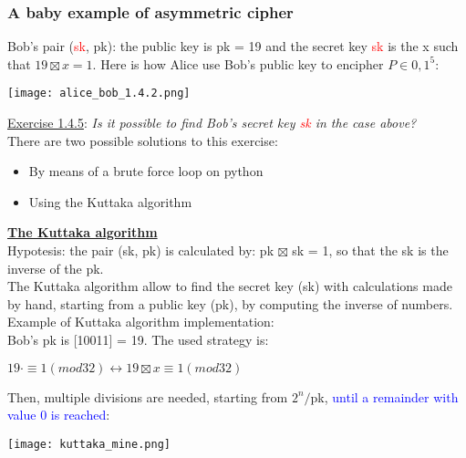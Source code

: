 \documentclass{article}
\begin{document}
\subsubsection{A baby example of asymmetric cipher}
Bob's pair (\textcolor{red}{sk}, pk): the public key is pk = 19 and the secret key \textcolor{red}{sk} is the x such that $19 \boxtimes x = 1$. Here is how Alice use Bob's public key to encipher $P \in {0,1}^5$:

\begin{center}
\texttt{[image: alice\_bob\_1.4.2.png]}
\end{center}

\underline{Exercise 1.4.5}: 
\textit{Is it possible to find Bob's secret key \textcolor{red}{sk} in the case above?}\\
There are two possible solutions to this exercise:
\begin{itemize}
    \item By means of a brute force loop on python
    \item Using the Kuttaka algorithm
\end{itemize}

\textbf{\underline{The Kuttaka algorithm}}\\
Hypotesis: the pair (sk, pk) is calculated by: pk $\boxtimes$ sk = 1, so that the sk is the inverse of the pk.\\
The Kuttaka algorithm allow to find the secret key (sk) with calculations made by hand, starting from a public key (pk), by computing the inverse of numbers.\\
Example of Kuttaka algorithm implementation:\\
Bob's pk is [10011] = 19. The used strategy is:

\begin{center}
    $19 \cdot \equiv 1 (mod 32)  \leftrightarrow 19 \boxtimes x \equiv 1 (mod 32)$
\end{center}

Then, multiple divisions are needed, starting from $2^n / $pk, \textcolor{blue}{until a remainder with value $0$ is reached}:

\begin{center}
\texttt{[image: kuttaka\_mine.png]}
\end{center}
\end{document}
